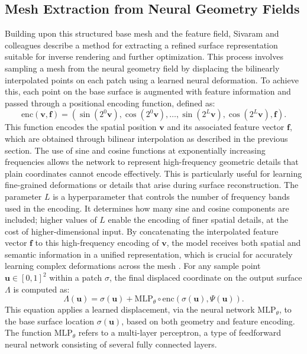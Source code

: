 \subsection{Mesh Extraction from Neural Geometry Fields}

Building upon this structured base mesh and the feature field, Sivaram and colleagues describe a method for extracting a refined surface representation suitable for inverse rendering and further optimization. 
This process involves sampling a mesh from the neural geometry field by displacing the bilinearly interpolated points on each patch using a learned neural deformation. 
To achieve this, each point on the base surface is augmented with feature information and passed through a positional encoding function, defined as: 
\[\text{enc}(\mathbf{v}, \mathbf{f}) = (\sin(2^0 \mathbf{v}), \cos(2^0 \mathbf{v}), \ldots, \sin(2^L \mathbf{v}), \cos(2^L \mathbf{v}), \mathbf{f}). \tag{3}\] 
This function encodes the spatial position $\mathbf{v}$ and its associated feature vector $\mathbf{f}$, which are obtained through bilinear interpolation as described in the previous section. 
The use of sine and cosine functions at exponentially increasing frequencies allows the network to represent high-frequency geometric details that plain coordinates cannot encode effectively.
This is particularly useful for learning fine-grained deformations or details that arise during surface reconstruction. 
The parameter $L$ is a hyperparameter that controls the number of frequency bands used in the encoding. 
It determines how many sine and cosine components are included; higher values of $L$ enable the encoding of finer spatial details, at the cost of higher-dimensional input. 
By concatenating the interpolated feature vector $\mathbf{f}$ to this high-frequency encoding of $\mathbf{v}$, the model receives both spatial and semantic information in a unified representation, which is crucial for accurately learning complex deformations across the mesh \cite{Mildenhall2020}. 
For any sample point $\mathbf{u} \in [0,1]^2$ within a patch $\sigma$, the final displaced coordinate on the output surface $\Lambda$ is computed as:\[
\Lambda(\mathbf{u}) = \sigma(\mathbf{u}) + \text{MLP}_\theta \circ \text{enc}(\sigma(\mathbf{u}), \Psi(\mathbf{u})). \tag{4}\] 
This equation applies a learned displacement, via the neural network $\text{MLP}_\theta$, to the base surface location $\sigma(\mathbf{u})$, based on both geometry and feature encoding. 
The function $\text{MLP}_\theta$ refers to a multi-layer perceptron, a type of feedforward neural network consisting of several fully connected layers. 
